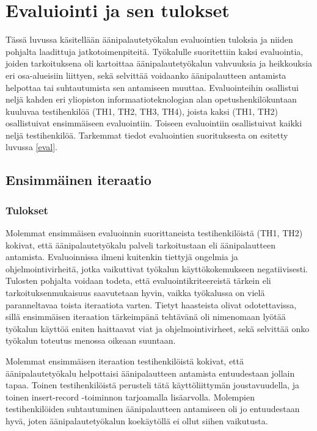 \documentclass[utf8]{gradu3}
\begin{document}
%

\chapter{Evaluiointi ja sen tulokset}
\label{evaluointi}

Tässä luvussa käsitellään äänipalautetyökalun evaluointien tuloksia ja niiden pohjalta laadittuja jatkotoimenpiteitä. Työkalulle suoritettiin kaksi evaluointia, joiden tarkoituksena oli kartoittaa äänipalautetyökalun vahvuuksia ja heikkouksia eri osa-alueisiin liittyen, sekä selvittää voidaanko äänipalautteen antamista helpottaa tai suhtautumista sen antamiseen muuttaa. Evaluointeihin osallistui neljä kahden eri yliopiston informaatioteknologian alan opetushenkilökuntaan kuuluvaa testihenkilöä (TH1, TH2, TH3, TH4), joista kaksi (TH1, TH2) osallistuivat ensimmäiseen evaluointiin. Toiseen evaluointiin osallistuivat kaikki neljä testihenkilöä. Tarkemmat tiedot evaluointien suorituksesta on esitetty luvussa \ref{eval}.

\section{Ensimmäinen iteraatio}

\subsection{Tulokset}

Molemmat ensimmäisen evaluoinnin suorittaneista testihenkilöistä (TH1, TH2) kokivat, että äänipalautetyökalu palveli tarkoitustaan eli äänipalautteen antamista. Evaluoinnissa ilmeni kuitenkin tiettyjä ongelmia ja ohjelmointivirheitä, jotka vaikuttivat työkalun käyttökokemukseen negatiivisesti. Tulosten pohjalta voidaan todeta, että evaluointikriteereistä tärkein eli tarkoituksenmukaisuus saavutetaan hyvin, vaikka työkalussa on vielä paranneltavaa toista iteraatiota varten. Tietyt haasteista olivat odotettavissa, sillä ensimmäisen iteraation tärkeimpänä tehtävänä oli nimenomaan lyötää työkalun käyttöä eniten haittaavat viat ja ohjelmointivirheet, sekä selvittää onko työkalun toteutus menossa oikeaan suuntaan.

Molemmat ensimmäisen iteraation testihenkilöistä kokivat, että äänipalautetyökalu helpottaisi äänipalautteen antamista entuudestaan jollain tapaa. Toinen testihenkilöistä perusteli tätä käyttöliittymän joustavuudella, ja toinen insert-record -toiminnon tarjoamalla lisäarvolla. Molempien testihenkilöiden suhtautuminen äänipalautteen antamiseen oli jo entuudestaan hyvä, joten äänipalautetyökalun koekäytöllä ei ollut siihen vaikutusta.
\end{document}
